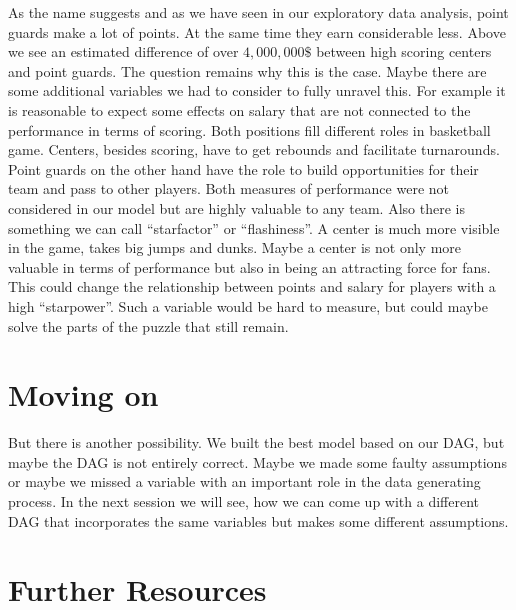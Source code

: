 \documentclass[
]{book}
\begin{document}
As the name suggests and as we have seen in our exploratory data analysis,
point guards make a lot of points. At the same time they earn considerable less.
Above we see an estimated difference of over \(4,000,000\$\) between high scoring
centers and point guards. The question remains why this is the case.
Maybe there are some additional variables we had to consider to fully unravel
this.
For example it is reasonable to expect some effects on salary that are not
connected to the performance in terms of scoring. Both positions fill different
roles in basketball game. Centers, besides scoring, have to get rebounds and
facilitate turnarounds. Point guards on the other hand have the role to build
opportunities for their team and pass to other players. Both measures of
performance were not considered in our model but are highly valuable to any team.
Also there is something we can call ``starfactor'' or ``flashiness''. A center is
much more visible in the game, takes big jumps and dunks. Maybe a center is not
only more valuable in terms of performance but also in being an attracting force
for fans. This could change the relationship between points and salary for
players with a high ``starpower''. Such a variable would be hard to measure,
but could maybe solve the parts of the puzzle that still remain.

\hypertarget{moving-on-3}{%
\section{Moving on}\label{moving-on-3}}

But there is another possibility. We built the best model based on our DAG, but
maybe the DAG is not entirely correct. Maybe we made some faulty assumptions or
maybe we missed a variable with an important role in the data generating
process. In the next session we will see, how we can come up with a different
DAG that incorporates the same variables but makes some different assumptions.

\hypertarget{further-resources-5}{%
\section{Further Resources}\label{further-resources-5}}
\end{document}
